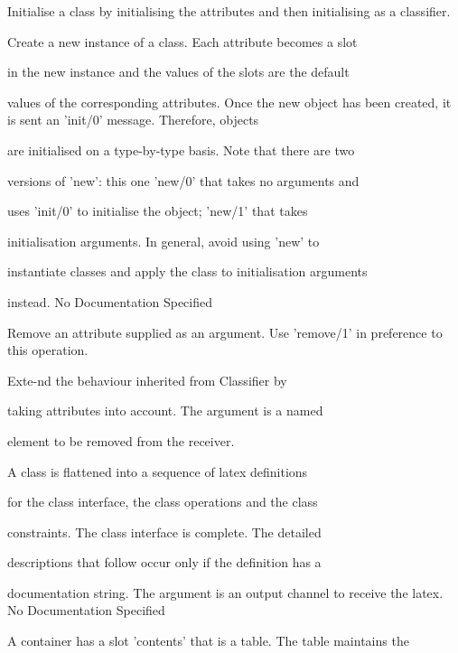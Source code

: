       Initialise a class by initialising the attributes and then 
      initialising as a classifier.

      Create a new instance of a class. Each attribute becomes a slot

      in the new instance and the values of the slots are the default

      values of the corresponding attributes. Once the new object has 
      been created, it is sent an 'init/0' message. Therefore, objects

      are initialised on a type-by-type basis. Note that there are two

      versions of 'new': this one 'new/0' that takes no arguments and

      uses 'init/0' to initialise the object; 'new/1' that takes

      initialisation arguments. In general, avoid using 'new' to

      instantiate classes and apply the class to initialisation arguments

      instead.
No Documentation Specified

      Remove an attribute supplied as an argument. Use 'remove/1'
      in preference to this operation.

      Exte-nd the behaviour inherited from Classifier by

      taking attributes into account. The argument is a named

      element to be removed from the receiver.

  
        A class is flattened into a sequence of latex definitions

        for the class interface, the class operations and the class

        constraints. The class interface is complete. The detailed

        descriptions that follow occur only if the definition has a

        documentation string. The argument is an output channel to 
        receive the latex.
No Documentation Specified

      A container has a slot 'contents' that is a table. The table maintains the

